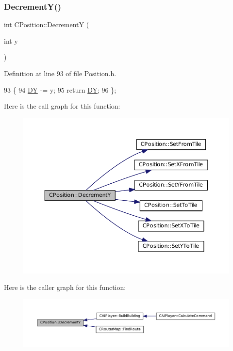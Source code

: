 \subsubsection{\texorpdfstring{Decrement\+Y()}{DecrementY()}}
{\footnotesize\ttfamily int C\+Position\+::\+DecrementY (\begin{DoxyParamCaption}\item[{int}]{y }\end{DoxyParamCaption})\hspace{0.3cm}{\ttfamily [inline]}}



Definition at line 93 of file Position.\+h.


\begin{DoxyCode}
93                              \{
94             \hyperlink{classCPosition_a84139c9e8eb547e7cf3cb851739943a4}{DY} -= y; 
95             \textcolor{keywordflow}{return} \hyperlink{classCPosition_a84139c9e8eb547e7cf3cb851739943a4}{DY};
96         \};
\end{DoxyCode}
Here is the call graph for this function\+:
\nopagebreak
\begin{figure}[H]
\begin{center}
\leavevmode
\includegraphics[width=350pt]{classCPosition_a51ee44d9e0457d6277567fd8a66fdec7_cgraph}
\end{center}
\end{figure}
Here is the caller graph for this function\+:
\nopagebreak
\begin{figure}[H]
\begin{center}
\leavevmode
\includegraphics[width=350pt]{classCPosition_a51ee44d9e0457d6277567fd8a66fdec7_icgraph}
\end{center}
\end{figure}
\hypertarget{classCPosition_a65124e3543c2d2e284e5eb517cd7f842}{}\label{classCPosition_a65124e3543c2d2e284e5eb517cd7f842} 
